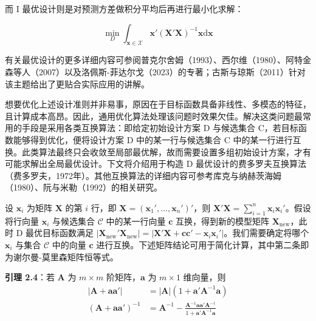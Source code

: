 \documentclass{ctexart}
\begin{document}
而 I 最优设计则是对预测方差做积分平均后再进行最小化求解：

\begin{equation*}
\min_D\int_{\boldsymbol{x}\in\mathcal{X}}\boldsymbol{x}'(\boldsymbol{X}'\boldsymbol{X})^{-1}\boldsymbol{x}\mathrm{d}\boldsymbol{x}
\tag{2.37}
\end{equation*}

有关最优设计的更多详细内容可参阅普克尔舍姆（1993）、西尔维（1980）、阿特金森等人（2007）以及洛佩斯-菲达尔戈（2023）的专著；古斯与琼斯（2011）针对该主题给出了更贴合实际应用的讲解。

想要优化上述设计准则并非易事，原因在于目标函数具备非线性、多模态的特征，且计算成本高昂。因此，通用优化算法处理该问题时效果欠佳。解决这类问题最常用的手段是采用各类互换算法：即给定初始设计方案 D 与候选集合 C，若目标函数能够得到优化，便将设计方案 D 中的某一行与候选集合 C 中的某一行进行互换。此类算法最终只会收敛至局部最优解，故而需要设置多组初始设计方案，才有可能求解出全局最优设计。下文将介绍用于构造 D 最优设计的费多罗夫互换算法（费多罗夫，1972年）。其他互换算法的详细内容可参考库克与纳赫茨海姆（1980）、阮与米勒（1992）的相关研究。

设 $\boldsymbol{x}_i$ 为矩阵 $\boldsymbol{X}$ 的第 $i$ 行，即 $\boldsymbol{X}=(\boldsymbol{x}_1',\dots,\boldsymbol{x}_n')'$，则 $\boldsymbol{X}'\boldsymbol{X}=\sum_{i=1}^n\boldsymbol{x}_i\boldsymbol{x}_i'$。假设将行向量 $\boldsymbol{x}_i$ 与候选集合 $\mathcal{C}$ 中的某一行向量 $\boldsymbol{c}$ 互换，得到新的模型矩阵 $\boldsymbol{X}_{\mathrm{new}}$，此时 D 最优目标函数满足 $|\boldsymbol{X}_{\mathrm{new}}'\boldsymbol{X}_{\mathrm{new}}|=|\boldsymbol{X}'\boldsymbol{X}+\boldsymbol{c}\boldsymbol{c}'-\boldsymbol{x}_i\boldsymbol{x}_i'|$。我们需要确定将哪个 $\boldsymbol{x}_i$ 与集合 $\mathcal{C}$ 中的向量 $\boldsymbol{c}$ 进行互换。下述矩阵结论可用于简化计算，其中第二条即为谢尔曼-莫里森矩阵恒等式。

\begin{mdquote}
\textbf{引理 2.4}：若 $\boldsymbol{A}$ 为 $m\times m$ 阶矩阵，$\boldsymbol{a}$ 为 $m\times1$ 维向量，则 \begin{align*}|\boldsymbol{A}+\boldsymbol{a}\boldsymbol{a}'|&=|\boldsymbol{A}|(1+\boldsymbol{a}'\boldsymbol{A}^{-1}\boldsymbol{a})\\(\boldsymbol{A}+\boldsymbol{a}\boldsymbol{a}')^{-1}&=\boldsymbol{A}^{-1}-\frac{\boldsymbol{A}^{-1}\boldsymbol{a}\boldsymbol{a}'\boldsymbol{A}^{-1}}{1+\boldsymbol{a}'\boldsymbol{A}^{-1}\boldsymbol{a}}\end{align*}
\end{mdquote}
\end{document}
